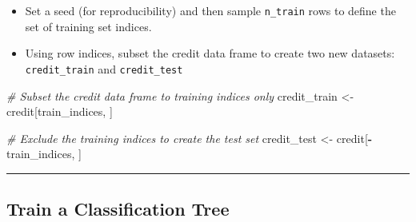 \documentclass[
]{book}
\newenvironment{Shaded}{\begin{snugshade}}{\end{snugshade}}
\newcommand{\CommentTok}[1]{\textcolor[rgb]{0.56,0.35,0.01}{\textit{#1}}}
\newcommand{\DecValTok}[1]{\textcolor[rgb]{0.00,0.00,0.81}{#1}}
\newcommand{\KeywordTok}[1]{\textcolor[rgb]{0.13,0.29,0.53}{\textbf{#1}}}
\newcommand{\NormalTok}[1]{#1}
\newcommand{\OperatorTok}[1]{\textcolor[rgb]{0.81,0.36,0.00}{\textbf{#1}}}
\newcommand{\StringTok}[1]{\textcolor[rgb]{0.31,0.60,0.02}{#1}}
\providecommand{\tightlist}{%
  \setlength{\itemsep}{0pt}\setlength{\parskip}{0pt}}
\begin{document}
\begin{Shaded}
\end{Shaded}

\begin{itemize}
\tightlist
\item
  Set a seed (for reproducibility) and then sample \texttt{n\_train} rows to define the set of training set indices.
\end{itemize}

\begin{Shaded}
\end{Shaded}

\begin{itemize}
\tightlist
\item
  Using row indices, subset the credit data frame to create two new datasets: \texttt{credit\_train} and \texttt{credit\_test}
\end{itemize}

\begin{Shaded}
\begin{Highlighting}[]
\CommentTok{# Subset the credit data frame to training indices only}
\NormalTok{credit_train <-}\StringTok{ }\NormalTok{credit[train_indices, ]  }
  
\CommentTok{# Exclude the training indices to create the test set}
\NormalTok{credit_test <-}\StringTok{ }\NormalTok{credit[}\OperatorTok{-}\NormalTok{train_indices, ]}
\end{Highlighting}
\end{Shaded}

\begin{center}\rule{0.5\linewidth}{0.5pt}\end{center}

\hypertarget{train-a-classification-tree}{%
\subsection{Train a Classification Tree}\label{train-a-classification-tree}}
\end{document}

